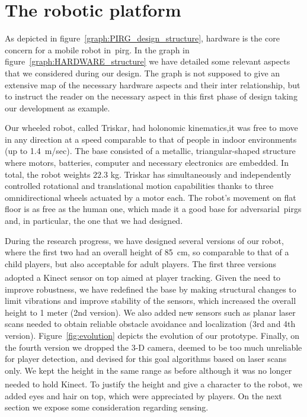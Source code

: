\section{The robotic platform}\label{sec:roboplat} 
As depicted in figure~\ref{graph:PIRG_design_structure}, hardware is the core concern for a mobile robot in~\gls{pirg}. In the graph in figure~\ref{graph:HARDWARE_structure} we have detailed some relevant aspects that we considered during our design. The graph is not supposed to give an extensive map of the necessary hardware aspects and their inter relationship, but to instruct the reader on the necessary aspect in this first phase of design taking our development as example. %

Our wheeled robot, called Triskar, had holonomic kinematics,\ie it was free to move in any direction at a speed comparable to that of people in indoor environments (up to 1.4~m/sec). The base consisted of a metallic, triangular-shaped structure where motors, batteries, computer and necessary electronics are embedded. In total, the robot weights $22.3$ kg. Triskar has simultaneously and independently controlled rotational and translational motion capabilities thanks to three omnidirectional wheels actuated by a motor each. The robot's movement on flat floor is as free as the human one, which made it a good base for adversarial~\gls{pirg}s and, in particular, the one that we had designed. 


During the research progress, we have designed several versions of our robot, where the first two had an overall height of 85~cm, so comparable to that of a child players, but also acceptable for adult players. The first three versions adopted a Kinect\textsuperscript{\textregistered} sensor on top aimed at player tracking. Given the need to improve robustness, we have redefined the base by making structural changes to limit vibrations and improve stability of the sensors, which increased the overall height to 1 meter (2nd version). We also added new sensors such as planar laser scans needed to obtain reliable obstacle avoidance and localization (3rd and 4th version). Figure~\ref{fig:evolution} depicts the evolution of our prototype. Finally, on the fourth version we dropped the 3-D camera, deemed to be too much unreliable for player detection, and devised for this goal algorithms based on laser scans only. We kept the height in the same range as before although it was no longer needed to hold Kinect\textsuperscript{\textregistered}. To justify the height and give a character to the robot, we added eyes and hair on top, which were appreciated by players. On the next section we expose some consideration regarding sensing.

